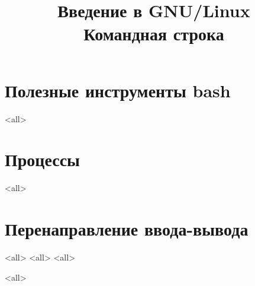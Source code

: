 
\title{Введение в GNU/Linux\\Командная строка}


\begin{frame}
 \frametitle{}
 \titlepage
\end{frame}
\section{Полезные инструменты bash}
\mode<all>{}

\section{Процессы}
\mode<all>{}

\section{Перенаправление ввода-вывода}
\mode<all>{}
\mode<all>{}
\mode<all>{}

\mode<all>

